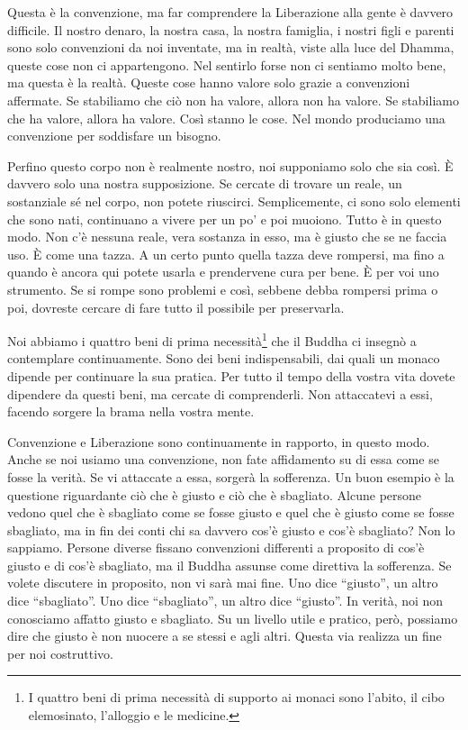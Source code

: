 Questa è la convenzione, ma far comprendere la Liberazione alla gente è
davvero difficile. Il nostro denaro, la nostra casa, la nostra famiglia,
i nostri figli e parenti sono solo convenzioni da noi inventate, ma in
realtà, viste alla luce del Dhamma, queste cose non ci appartengono. Nel
sentirlo forse non ci sentiamo molto bene, ma questa è la realtà. Queste
cose hanno valore solo grazie a convenzioni affermate. Se stabiliamo che
ciò non ha valore, allora non ha valore. Se stabiliamo che ha valore,
allora ha valore. Così stanno le cose. Nel mondo produciamo una
convenzione per soddisfare un bisogno.

Perfino questo corpo non è realmente nostro, noi supponiamo solo che sia
così. È davvero solo una nostra supposizione. Se cercate di trovare un
reale, un sostanziale sé nel corpo, non potete riuscirci. Semplicemente,
ci sono solo elementi che sono nati, continuano a vivere per un po' e
poi muoiono. Tutto è in questo modo. Non c'è nessuna reale, vera
sostanza in esso, ma è giusto che se ne faccia uso. È come una tazza. A
un certo punto quella tazza deve rompersi, ma fino a quando è ancora qui
potete usarla e prendervene cura per bene. È per voi uno strumento. Se
si rompe sono problemi e così, sebbene debba rompersi prima o poi,
dovreste cercare di fare tutto il possibile per preservarla.

Noi abbiamo i quattro beni di prima necessità\footnote{I quattro beni di
  prima necessità di supporto ai monaci sono l'abito, il cibo
  elemosinato, l'alloggio e le medicine.} che il Buddha ci insegnò a
contemplare continuamente. Sono dei beni indispensabili, dai quali un
monaco dipende per continuare la sua pratica. Per tutto il tempo della
vostra vita dovete dipendere da questi beni, ma cercate di comprenderli.
Non attaccatevi a essi, facendo sorgere la brama nella vostra mente.

Convenzione e Liberazione sono continuamente in rapporto, in questo
modo. Anche se noi usiamo una convenzione, non fate affidamento su di
essa come se fosse la verità. Se vi attaccate a essa, sorgerà la
sofferenza. Un buon esempio è la questione riguardante ciò che è giusto
e ciò che è sbagliato. Alcune persone vedono quel che è sbagliato come
se fosse giusto e quel che è giusto come se fosse sbagliato, ma in fin
dei conti chi sa davvero cos'è giusto e cos'è sbagliato? Non lo
sappiamo. Persone diverse fissano convenzioni differenti a proposito di
cos'è giusto e di cos'è sbagliato, ma il Buddha assunse come direttiva
la sofferenza. Se volete discutere in proposito, non vi sarà mai fine.
Uno dice ``giusto'', un altro dice ``sbagliato''. Uno dice
``sbagliato'', un altro dice ``giusto''. In verità, noi non conosciamo
affatto giusto e sbagliato. Su un livello utile e pratico, però,
possiamo dire che giusto è non nuocere a se stessi e agli altri. Questa
via realizza un fine per noi costruttivo.

